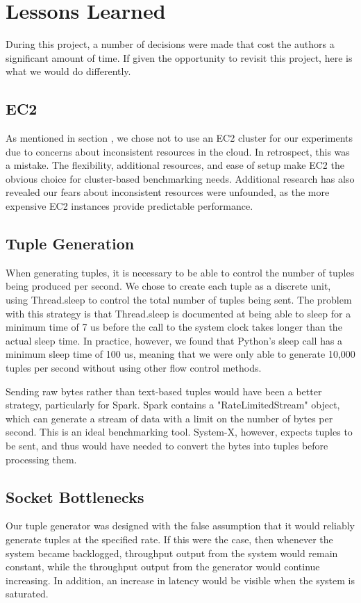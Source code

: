 \section{Lessons Learned}
During this project, a number of decisions were made that cost the authors a significant amount of time.  If given the opportunity to revisit this project, here is what we would do differently.

\subsection{EC2}
As mentioned in section , we chose not to use an EC2 cluster for our experiments due to concerns about inconsistent resources in the cloud.  In retrospect, this was a mistake.  The flexibility, additional resources, and ease of setup make EC2 the obvious choice for cluster-based benchmarking needs.  Additional research has also revealed our fears about inconsistent resources were unfounded, as the more expensive EC2 instances provide predictable performance.

\subsection{Tuple Generation}
When generating tuples, it is necessary to be able to control the number of tuples being produced per second.  We chose to create each tuple as a discrete unit, using Thread.sleep to control the total number of tuples being sent.  The problem with this strategy is that Thread.sleep is documented at being able to sleep for a minimum time of 7 us before the call to the system clock takes longer than the actual sleep time.  In practice, however, we found that Python's sleep call has a minimum sleep time of 100 us, meaning that we were only able to generate 10,000 tuples per second without using other flow control methods.

Sending raw bytes rather than text-based tuples would have been a better strategy, particularly for Spark.  Spark contains a "RateLimitedStream" object, which can generate a stream of data with a limit on the number of bytes per second.  This is an ideal benchmarking tool.  System-X, however, expects tuples to be sent, and thus would have needed to convert the bytes into tuples before processing them.

\subsection{Socket Bottlenecks}
Our tuple generator was designed with the false assumption that it would reliably generate tuples at the specified rate.  If this were the case, then whenever the system became backlogged, throughput output from the system would remain constant, while the throughput output from the generator would continue increasing.  In addition, an increase in latency would be visible when the system is saturated.

